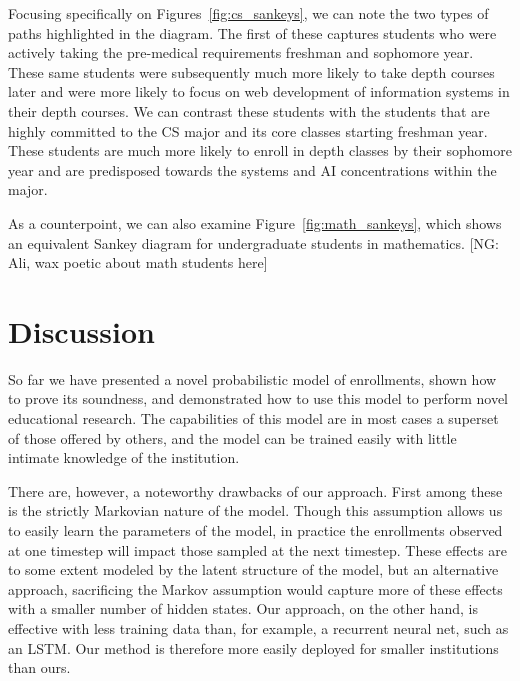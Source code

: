 \documentclass{edm_template}
\providecommand{\nvg}[1]{{\color{red} [NG: #1]}}
\begin{document}
Focusing specifically on Figures~\ref{fig:cs_sankeys}, we can note the two types of paths highlighted in the diagram. The first of these captures students who were actively taking the pre-medical requirements freshman and sophomore year. These same students were subsequently much more likely to take depth courses later and were more likely to focus on web development of information systems in their depth courses. We can contrast these students with the students that are highly committed to the CS major and its core classes starting freshman year. These students are much more likely to enroll in depth classes by their sophomore year and are predisposed towards the systems and AI concentrations within the major.
   
As a counterpoint, we can also examine Figure~\ref{fig:math_sankeys}, which shows an equivalent Sankey diagram for undergraduate students in mathematics. \nvg{Ali, wax poetic about math students here}


   
\section{Discussion}

So far we have presented a novel probabilistic model of enrollments, shown how to prove its soundness, and demonstrated how to use this model to perform novel educational research. The capabilities of this model are in most cases a superset of those offered by others, and the model can be trained easily with little intimate knowledge of the institution. 

There are, however, a noteworthy drawbacks of our approach. First among these is the strictly Markovian nature of the model. Though this assumption allows us to easily learn the parameters of the model, in practice the enrollments observed at one timestep will impact those sampled at the next timestep. These effects are to some extent modeled by the latent structure of the model, but an alternative approach, sacrificing the Markov assumption would capture more of these effects with a smaller number of hidden states. Our approach, on the other hand, is effective with less training data than, for example, a recurrent neural net, such as an LSTM. Our method is therefore more easily deployed for smaller institutions than ours.
\end{document}
